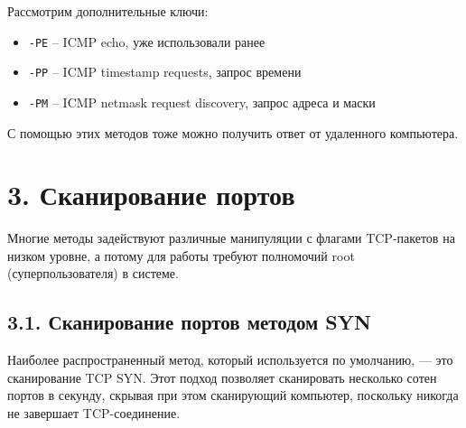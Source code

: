 Рассмотрим дополнительные ключи:
\begin{itemize}
    \item \texttt{-PE} -- ICMP echo, уже использовали ранее
    \item \texttt{-PP} -- ICMP timestamp requests, запрос времени
    \item \texttt{-PM} -- ICMP netmask request discovery, запрос адреса и маски
\end{itemize}
С помощью этих методов тоже можно получить ответ от удаленного компьютера.

\section*{3. Сканирование портов}

Многие методы задействуют различные манипуляции с флагами TCP-пакетов на низком уровне, а потому для работы требуют полномочий root (суперпользователя) в системе.

\subsection*{3.1. Сканирование портов методом SYN}

Наиболее распространенный метод, который используется по умолчанию, — это сканирование TCP SYN. Этот подход позволяет сканировать несколько сотен портов в секунду, скрывая при этом сканирующий компьютер, поскольку никогда не завершает TCP-соединение.

